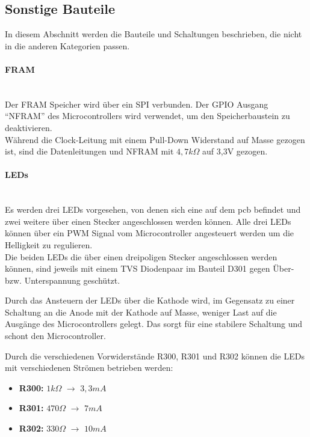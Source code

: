 \subsection{Sonstige Bauteile}
In diesem Abschnitt werden die Bauteile und Schaltungen beschrieben, die nicht in die anderen Kategorien passen.

\paragraph{\ac{FRAM}}\mbox{}\\
Der \ac{FRAM} Speicher wird über ein \ac{SPI} verbunden. Der \ac{GPIO} Ausgang \enquote{NFRAM} des Microcontrollers wird verwendet,
um den Speicherbaustein zu deaktivieren. \\
Während die Clock-Leitung mit einem Pull-Down Widerstand auf Masse gezogen ist, sind die Datenleitungen und NFRAM mit \(4,7k\Omega\)
auf 3,3V gezogen.

\paragraph{LEDs}\mbox{}\\
Es werden drei \acp{LED} vorgesehen, von denen sich eine auf dem \ac{pcb} befindet und zwei weitere über einen Stecker angeschlossen
werden können. Alle drei \acp{LED} können über ein \ac{PWM} Signal vom Microcontroller angesteuert werden um die Helligkeit zu
regulieren. \\
Die beiden \acp{LED} die über einen dreipoligen Stecker angeschlossen werden können, sind jeweils mit einem TVS Diodenpaar im Bauteil 
D301 gegen Über- bzw. Unterspannung geschützt. 

Durch das Ansteuern der \acp{LED} über die Kathode wird, im Gegensatz zu einer Schaltung an die Anode mit der Kathode auf Masse, 
weniger Last auf die Ausgänge des Microcontrollers gelegt. Das sorgt für eine stabilere Schaltung und schont den Microcontroller.

Durch die verschiedenen Vorwiderstände R300, R301 und R302 können die \acp{LED} mit verschiedenen Strömen betrieben werden:
\begin{itemize}
    \item \textbf{R300:} \(1k\Omega\) \(\rightarrow\) \(3,3mA\)
    \item \textbf{R301:} \(470\Omega\) \(\rightarrow\) \(7mA\)
    \item \textbf{R302:} \(330\Omega\) \(\rightarrow\) \(10mA\)
\end{itemize}

